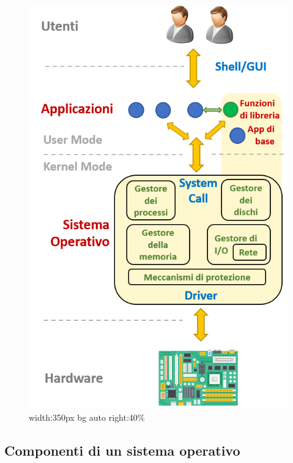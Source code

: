 \documentclass[]{article}
\begin{document}
\begin{figure}
\centering
\includegraphics{images/so-scheme.png}
\caption{width:350px bg auto right:40\%}
\end{figure}

\hypertarget{componenti-di-un-sistema-operativo-1}{%
\subsection{Componenti di un sistema
operativo}\label{componenti-di-un-sistema-operativo-1}}
\end{document}
